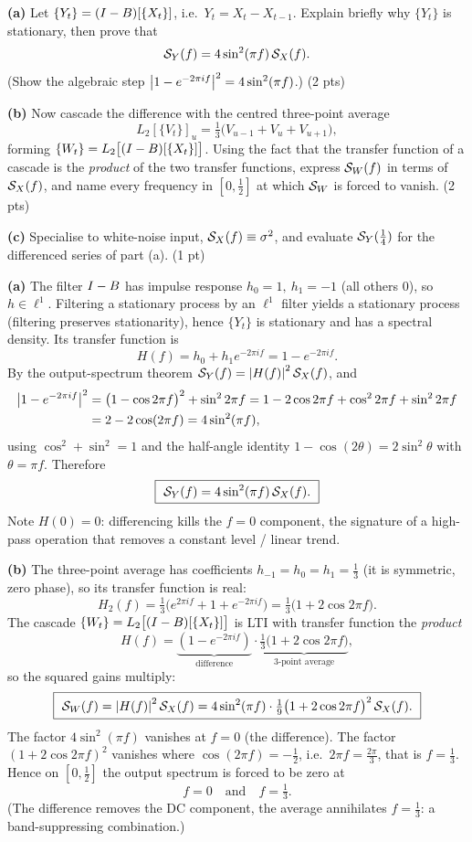 \documentclass[11pt]{article}
\newcommand{\filt}{L}
\begin{document}
\textbf{(a)} Let $\{Y_t\}=(I-B)[\{X_t\}]$, i.e.\ $Y_t=X_t-X_{t-1}$. Explain briefly why $\{Y_t\}$ is stationary, then prove that
\[
\mathcal{S}_Y(f)=4\sin^2(\pi f)\,\mathcal{S}_X(f).
\]
(Show the algebraic step $\left\lvert 1-e^{-2\pi i f} \right\rvert^2=4\sin^2(\pi f)$.) \hfill(2 pts)

\textbf{(b)} Now cascade the difference with the centred three-point average
\[
\filt_2[\{V_t\}]_u=\tfrac13\bigl(V_{u-1}+V_u+V_{u+1}\bigr),
\]
forming $\{W_t\}=\filt_2\bigl[(I-\Bsh)[\{X_t\}]\bigr]$. Using the fact that the transfer function of a cascade is the \emph{product} of the two transfer functions, express $\mathcal{S}_W(f)$ in terms of $\mathcal{S}_X(f)$, and name every frequency in $[0,\tfrac12]$ at which $\mathcal{S}_W$ is forced to vanish. \hfill(2 pts)

\textbf{(c)} Specialise to white-noise input, $\mathcal{S}_X(f)\equiv\sigma^2$, and evaluate $\mathcal{S}_Y(\tfrac14)$ for the differenced series of part (a). \hfill(1 pt)
\statementend

\textbf{(a)} The filter $I-B$ has impulse response $h_0=1,\ h_1=-1$ (all others $0$), so $h\in\ell^1$. Filtering a stationary process by an $\ell^1$ filter yields a stationary process (filtering preserves stationarity), hence $\{Y_t\}$ is stationary and has a spectral density. Its transfer function is
\[
H(f)=h_0+h_1 e^{-2\pi i f}=1-e^{-2\pi i f}.
\]
By the output-spectrum theorem $\mathcal{S}_Y(f)=\left\lvert H(f) \right\rvert^2\mathcal{S}_X(f)$, and
\[
\begin{aligned}
\left\lvert 1-e^{-2\pi i f} \right\rvert^2
&=\bigl(1-\cos 2\pi f\bigr)^2+\sin^2 2\pi f
 =1-2\cos 2\pi f+\cos^2 2\pi f+\sin^2 2\pi f\\
&=2-2\cos(2\pi f)=4\sin^2(\pi f),
\end{aligned}
\]
using $\cos^2+\sin^2=1$ and the half-angle identity $1-\cos(2\theta)=2\sin^2\theta$ with $\theta=\pi f$. Therefore
\[
\boxed{\ \mathcal{S}_Y(f)=4\sin^2(\pi f)\,\mathcal{S}_X(f).\ }
\]
Note $H(0)=0$: differencing kills the $f=0$ component, the signature of a high-pass operation that removes a constant level / linear trend.

\textbf{(b)} The three-point average has coefficients $h_{-1}=h_0=h_1=\tfrac13$ (it is symmetric, zero phase), so its transfer function is real:
\[
H_2(f)=\tfrac13\bigl(e^{2\pi i f}+1+e^{-2\pi i f}\bigr)=\tfrac13\bigl(1+2\cos 2\pi f\bigr).
\]
The cascade $\{W_t\}=\filt_2\bigl[(I-\Bsh)[\{X_t\}]\bigr]$ is LTI with transfer function the \emph{product}
\[
H(f)=\underbrace{(1-e^{-2\pi i f})}_{\text{difference}}\cdot
\underbrace{\tfrac13\bigl(1+2\cos 2\pi f\bigr)}_{\text{3-point average}},
\]
so the squared gains multiply:
\[
\boxed{\
\sdf_W(f)=\abs{H(f)}^2\sdf_X(f)
=4\sin^2(\pi f)\cdot\tfrac19\bigl(1+2\cos 2\pi f\bigr)^2\,\sdf_X(f).\ }
\]
The factor $4\sin^2(\pi f)$ vanishes at $f=0$ (the difference). The factor $(1+2\cos 2\pi f)^2$ vanishes where $\cos(2\pi f)=-\tfrac12$, i.e.\ $2\pi f=\tfrac{2\pi}{3}$, that is $f=\tfrac13$. Hence on $[0,\tfrac12]$ the output spectrum is forced to be zero at
\[
f=0\quad\text{and}\quad f=\tfrac13 .
\]
(The difference removes the DC component, the average annihilates $f=\tfrac13$: a band-suppressing combination.)
\end{document}
